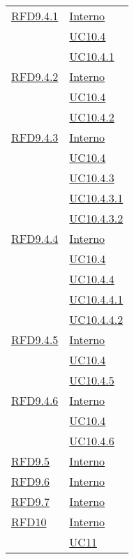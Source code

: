 \begin{longtable}{|>{\centering}m{5cm}|m{5cm}<{\centering}|}
\hyperlink{RFD9.4.1}{RFD9.4.1} & \hyperlink{Interno}{Interno}\\
& \hyperref[UC10.4]{UC10.4}\\
& \hyperref[UC10.4.1]{UC10.4.1}\\ \hline

\hyperlink{RFD9.4.2}{RFD9.4.2} & \hyperlink{Interno}{Interno}\\
& \hyperref[UC10.4]{UC10.4}\\
& \hyperref[UC10.4.2]{UC10.4.2}\\ \hline

\hyperlink{RFD9.4.3}{RFD9.4.3} & \hyperlink{Interno}{Interno}\\
& \hyperref[UC10.4]{UC10.4}\\
& \hyperref[UC10.4.3]{UC10.4.3}\\
& \hyperref[UC10.4.3.1]{UC10.4.3.1}\\
& \hyperref[UC10.4.3.2]{UC10.4.3.2}\\ \hline

\hyperlink{RFD9.4.4}{RFD9.4.4} & \hyperlink{Interno}{Interno}\\
& \hyperref[UC10.4]{UC10.4}\\
& \hyperref[UC10.4.4]{UC10.4.4}\\
& \hyperref[UC10.4.4.1]{UC10.4.4.1}\\
& \hyperref[UC10.4.4.2]{UC10.4.4.2}\\ \hline

\hyperlink{RFD9.4.5}{RFD9.4.5} & \hyperlink{Interno}{Interno}\\
& \hyperref[UC10.4]{UC10.4}\\
& \hyperref[UC10.4.5]{UC10.4.5}\\ \hline

\hyperlink{RFD9.4.6}{RFD9.4.6} & \hyperlink{Interno}{Interno}\\
& \hyperref[UC10.4]{UC10.4}\\
& \hyperref[UC10.4.6]{UC10.4.6}\\ \hline

\hyperlink{RFD9.5}{RFD9.5} & \hyperlink{Interno}{Interno}\\ \hline

\hyperlink{RFD9.6}{RFD9.6} & \hyperlink{Interno}{Interno}\\ \hline

\hyperlink{RFD9.7}{RFD9.7} & \hyperlink{Interno}{Interno}\\ \hline

\hyperlink{RFD10}{RFD10} & \hyperlink{Interno}{Interno}\\
& \hyperref[UC11]{UC11}\\ \hline


\end{longtable}
